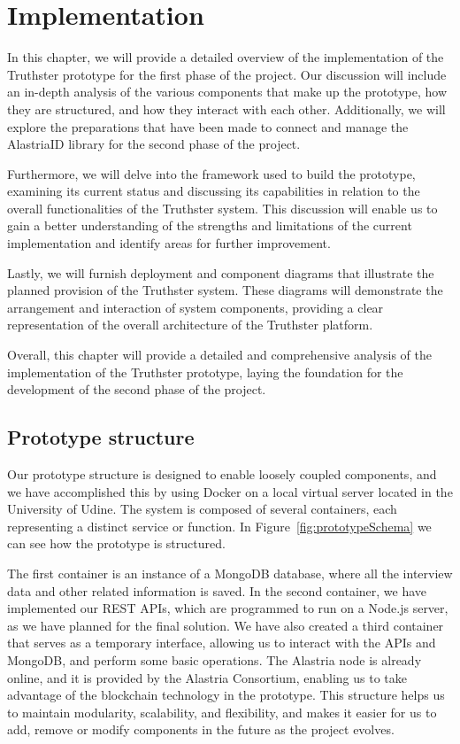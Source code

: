 \documentclass[target=mst,aauheader=]{thud}
\begin{document}
\chapter{Implementation}
\label{chapter:implementation}

In this chapter, we will provide a detailed overview of the implementation of the Truthster prototype for the first phase of the project. Our discussion will include an in-depth analysis of the various components that make up the prototype, how they are structured, and how they interact with each other. Additionally, we will explore the preparations that have been made to connect and manage the AlastriaID library for the second phase of the project.

Furthermore, we will delve into the framework used to build the prototype, examining its current status and discussing its capabilities in relation to the overall functionalities of the Truthster system. This discussion will enable us to gain a better understanding of the strengths and limitations of the current implementation and identify areas for further improvement.

Lastly, we will furnish deployment and component diagrams that illustrate the planned provision of the Truthster system. These diagrams will demonstrate the arrangement and interaction of system components, providing a clear representation of the overall architecture of the Truthster platform.

Overall, this chapter will provide a detailed and comprehensive analysis of the implementation of the Truthster prototype, laying the foundation for the development of the second phase of the project.

\section{Prototype structure}

Our prototype structure is designed to enable loosely coupled components, and we have accomplished this by using Docker \cite{docker} on a local virtual server located in the University of Udine. The system is composed of several containers, each representing a distinct service or function. In Figure~\ref{fig:prototypeSchema} we can see how the prototype is structured.
 
The first container is an instance of a MongoDB database, where all the interview data and other related information is saved. In the second container, we have implemented our REST APIs, which are programmed to run on a Node.js server, as we have planned for the final solution. We have also created a third container that serves as a temporary interface, allowing us to interact with the APIs and MongoDB, and perform some basic operations. The Alastria node is already online, and it is provided by the Alastria Consortium, enabling us to take advantage of the blockchain technology in the prototype. This structure helps us to maintain modularity, scalability, and flexibility, and makes it easier for us to add, remove or modify components in the future as the project evolves.
\end{document}
